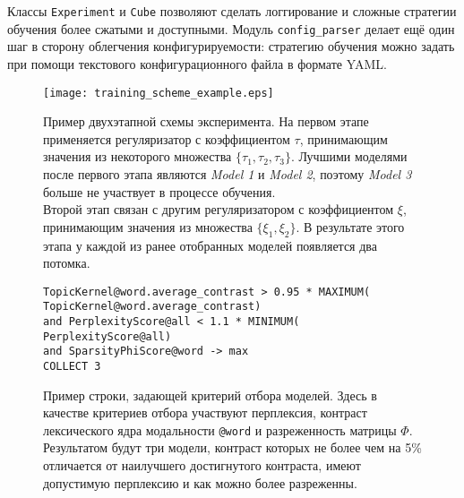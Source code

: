 Классы \texttt{Experiment} и \texttt{Cube} позволяют сделать логгирование и сложные стратегии обучения более сжатыми и доступными. Модуль \texttt{config\_parser} делает ещё один шаг в сторону облегчения конфигурируемости: стратегию обучения можно задать при помощи текстового конфигурационного файла в формате YAML.  

\begin{figure}[ht]
    \centering
    \captionsetup{justification=raggedright,singlelinecheck=false,format=hang}

    \texttt{[image: training\_scheme\_example.eps]}

    \caption{
        Пример двухэтапной схемы эксперимента.
        На первом этапе применяется регуляризатор с коэффициентом $\tau$, принимающим значения из некоторого множества $\{\tau_1, \tau_2, \tau_3\}$.
        Лучшими моделями после первого этапа являются \emph{Model 1} и \emph{Model 2}, поэтому \emph{Model 3} больше не участвует в процессе обучения.\\
        Второй этап связан с другим регуляризатором с коэффициентом $\xi$, принимающим значения из множества $\{\xi_1, \xi_2\}$.
        В результате этого этапа у каждой из ранее отобранных моделей  появляется два потомка.
    }
\label{Training-scheme}
\end{figure} 


\begin{figure*}[ht]
\captionsetup{justification=raggedright,singlelinecheck=false,format=hang}
\texttt{TopicKernel@word.average\_contrast > 0.95 * MAXIMUM( \\
\hphantom{\ \ \ \ \ \ \ \ }TopicKernel@word.average\_contrast) \\
\hphantom{\ \ } and PerplexityScore@all < 1.1 * MINIMUM( \\
\hphantom{\ \ \ \ \ \ \ \ }PerplexityScore@all) \\
\hphantom{\ \ } and SparsityPhiScore@word -> max\\
\hphantom{\ \ } COLLECT 3} \\
\caption{Пример строки, задающей критерий отбора моделей. Здесь в качестве критериев отбора участвуют перплексия, контраст лексического ядра модальности \texttt{@word} и разреженность матрицы $\Phi$. Результатом будут три модели, контраст которых не более чем на 5\% отличается от наилучшего достигнутого контраста, имеют допустимую перплексию и как можно более разреженны. }
\label{DSL-example}
\end{figure*} 


